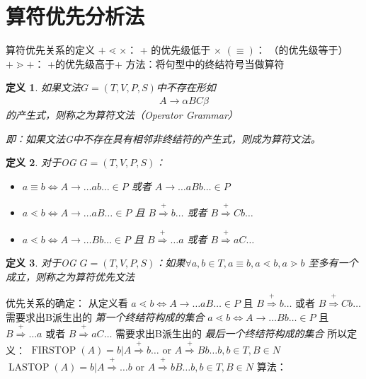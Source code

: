 \documentclass[oneside]{ctexbook}
\DeclareMathOperator{\firstop}{FIRSTOP}
\DeclareMathOperator{\lastop}{LASTOP}
\newtheorem{definition}{定义}[section]
\newcommand*{\tto}[0]{\Rightarrow}
\begin{document}
\section{算符优先分析法}
\begin{outline}
    \1 算符优先关系的定义
        \2 $+ \lessdot \times$：  + 的优先级低于 $\times$
        \2 $( \equiv  )$： （的优先级等于）
        \2 $+ \gtrdot +$： +的优先级高于+
    \2 方法：将句型中的终结符号当做算符
\0
\begin{definition}
    如果文法$G = (T, V, P, S)$中不存在形如
    \begin{eqnarray}
        A \to \alpha BC\beta
    \end{eqnarray}
    的产生式，则称之为算符文法（Operator Grammar）

    即：如果文法G中不存在具有\emph{相邻非终结符}的产生式，则成为算符文法。
\end{definition}
\begin{definition}
    对于OG $G = (T, V, P, S)$：
    \begin{itemize}
        \item $a \equiv b \iff A \to \dots ab \dots \in P$ 或者 $A \to \dots aBb \dots \in P$
        \item $a \lessdot b \iff A \to \dots aB \dots \in P$ 且 $B \overset{+} \tto b\dots$ 或者 $B \overset{+} \tto Cb \dots$
        \item $a \lessdot b \iff A \to \dots Bb \dots \in P$ 且 $B \overset{+} \tto \dots a$ 或者 $B \overset{+} \tto aC \dots$
    \end{itemize}
\end{definition}
\begin{definition}
    对于OG $G = (T, V, P, S)$：如果$\forall a,b \in T, a \equiv b, a \lessdot b, a \gtrdot b$ 至多有一个成立，则称之为算符优先文法
\end{definition}
    \1 优先关系的确定：
        \2 从定义看
            \3 $a \lessdot b \iff A \to \dots aB \dots \in P$ 且 $B \overset{+} \tto b\dots$ 或者 $B \overset{+} \tto Cb \dots$
            \3 需要求出B派生出的 \emph{第一个终结符构成的集合}
            \3 $a \lessdot b \iff A \to \dots Bb \dots \in P$ 且 $B \overset{+} \tto \dots a$ 或者 $B \overset{+} \tto aC \dots$
            \3 需要求出B派生出的 \emph{最后一个终结符构成的集合}
        \2 所以定义：
            \3 $\firstop(A) = {b | A\overset+ \tto b\dots \text{ or } A \overset+ \tto Bb \dots b, b \in T, B \in N}$
            \3 $\lastop(A) = {b | A\overset+ \tto \dots b \text{ or }  A \overset+ \tto bB \dots b, b \in T, B \in N}$
    \1 算法：

\end{outline}
\end{document}

